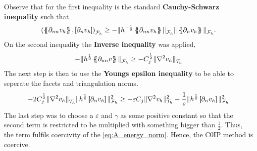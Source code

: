 Observe that for the first inequality is the standard \textbf{Cauchy-Schwarz inequality} such that $$\left( \mean{ \partial_{nn} v_{h} }  , \jump{ \partial _{n} v_{h} }   \right) _{\mathcal{F} _{h}} \ge - \| h^{-\frac{1}{2}} \mean{ \partial _{nn}
v_{h} }    \|_{\mathcal{F}_{h}   }^{  } \| \mean{ \partial _{n}v_{h} }   \|_{ \mathcal{F}_{h}   }^{  } .  $$ On the second inequality the \textbf{Inverse inequality} was applied,
\[
- \| h^{\frac{1}{2}} \left\{\!\!\left\{ \partial _{nn}v \right\}\!\!\right\}   \|_{ \mathcal{F} _{h}  }^{  }\ge - C_{j}^{\frac{1}{2}} \| \nabla ^2 v_{h} \|_{ \mathcal{T} _{h} }^{  }
\]
The next step is then to use the \textbf{Youngs epsilon inequality} to be able to seperate the facets and triangulation norms. \[
 - 2 C^{\frac{1}{2}}_{j} \|  \nabla ^2 v_{h}    \|_{ \mathcal{T} _{h}  }^{  } \| h^{\frac{1}{2}} \jump{ \partial _{n} v_{h} }   \|_{ \mathcal{F} _{h} }^{2  } \ge- \varepsilon C_{j} \| \nabla ^2 v_{h} \|_{ \mathcal{T} _{h} }^{2  } -
 \frac{1}{\varepsilon } \| h^{\frac{1}{2}} \jump{ \partial _{n} v_{h} }   \|_{ \mathcal{F} _{h} }^{2  }
\]
The last step was to choose a $\varepsilon $ and $\gamma $ as some positive constant so that the second term is restricted to be multiplied with something bigger than $\frac{1}{2}$. Thus, the term fulfils coercivity of the \eqref{eq:A_energy_norm}. Hence, the C0IP method is coercive.

